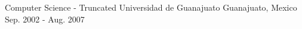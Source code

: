 

\begin{cventries}

  \cventry
    {Computer Science - Truncated} %
    {Universidad de Guanajuato} %
    {Guanajuato, Mexico} %
    {Sep. 2002 - Aug. 2007} %
    {}
    {
    }

\end{cventries}
